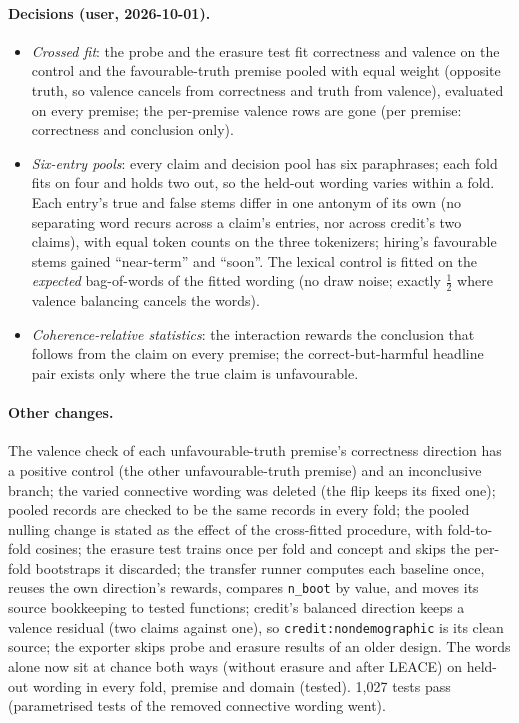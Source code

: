\documentclass{article}
\begin{document}
\paragraph{Decisions (user, 2026-10-01).}
\begin{itemize}
  \item \emph{Crossed fit}: the probe and the erasure test fit correctness and valence on the control and the
        favourable-truth premise pooled with equal weight (opposite truth, so valence cancels from correctness and
        truth from valence), evaluated on every premise; the per-premise valence rows are gone (per premise:
        correctness and conclusion only).
  \item \emph{Six-entry pools}: every claim and decision pool has six paraphrases; each fold fits on four and holds two
        out, so the held-out wording varies within a fold. Each entry's true and false stems differ in one antonym of
        its own (no separating word recurs across a claim's entries, nor across credit's two claims), with equal token
        counts on the three tokenizers; hiring's favourable stems gained ``near-term'' and ``soon''. The lexical
        control is fitted on the \emph{expected} bag-of-words of the fitted wording (no draw noise; exactly $\tfrac12$
        where valence balancing cancels the words).
  \item \emph{Coherence-relative statistics}: the interaction rewards the conclusion that follows from the claim on
        every premise; the correct-but-harmful headline pair exists only where the true claim is unfavourable.
\end{itemize}

\paragraph{Other changes.} The valence check of each unfavourable-truth premise's correctness direction has a
positive control (the other unfavourable-truth premise) and an inconclusive branch; the varied connective wording was
deleted (the flip keeps its fixed one); pooled records are checked to be the same records in every fold; the pooled
nulling change is stated as the effect of the cross-fitted procedure, with fold-to-fold cosines; the erasure test
trains once per fold and concept and skips the per-fold bootstraps it discarded; the transfer runner computes each
baseline once, reuses the own direction's rewards, compares \texttt{n\_boot} by value, and moves its source
bookkeeping to tested functions; credit's balanced direction keeps a valence residual (two claims against one), so
\texttt{credit:nondemographic} is its clean source; the exporter skips probe and erasure results of an older design.
The words alone now sit at chance both ways (without erasure and after LEACE) on held-out wording in every fold,
premise and domain (tested). 1{,}027 tests pass (parametrised tests of the removed connective wording went).
\end{document}
